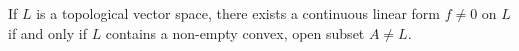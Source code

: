 If $L$ is a topological vector space, there exists a continuous linear form $f \neq 0$ on $L$ if and only if $L$ contains a non-empty convex, open subset $A \neq L$.
